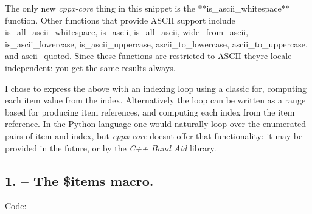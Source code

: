 The only new {\itshape cppx-\/core} thing in this snippet is the $\ast$$\ast${\ttfamily is\+\_\+ascii\+\_\+whitespace}$\ast$$\ast$ function. Other functions that provide A\+S\+C\+II support include {\ttfamily is\+\_\+all\+\_\+ascii\+\_\+whitespace}, {\ttfamily is\+\_\+ascii}, {\ttfamily is\+\_\+all\+\_\+ascii}, {\ttfamily wide\+\_\+from\+\_\+ascii}, {\ttfamily is\+\_\+ascii\+\_\+lowercase}, {\ttfamily is\+\_\+ascii\+\_\+uppercase}, {\ttfamily ascii\+\_\+to\+\_\+lowercase}, {\ttfamily ascii\+\_\+to\+\_\+uppercase}, and {\ttfamily ascii\+\_\+quoted}. Since these functions are restricted to A\+S\+C\+II they\textquotesingle{}re locale independent\+: you get the same results always.

I chose to express the above with an indexing loop using a classic {\ttfamily for}, computing each item value from the index. Alternatively the loop can be written as a range based {\ttfamily for} producing item references, and computing each index from the item reference. In the Python language one would naturally loop over the {\ttfamily enumerate}d pairs of item and index, but {\itshape cppx-\/core} doesn\textquotesingle{}t offer that functionality\+: it may be provided in the future, or by the {\itshape C++ Band Aid} library.

\subsection*{1. – The {\ttfamily \$items} macro.}

Code\+:


\begin{DoxyCode}{0}
\DoxyCodeLine{\{}
\DoxyCodeLine{}
\DoxyCodeLine{        );}
\end{DoxyCode}


